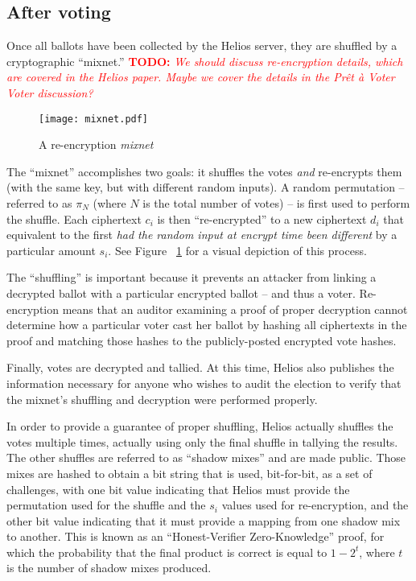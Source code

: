 \documentclass[10pt,twocolumn]{article}
\newcommand{\todo}[1]{\textcolor{red}{\textbf{TODO:} \emph{#1}}}
\newcommand{\term}[1]{\textit{#1}}
\newcommand{\preta}{Pr\^{e}t \`{a}}
\newcommand{\pv}{\preta{} Voter}
\begin{document}
\subsection{After voting}

Once all ballots have been collected by the Helios server, they are shuffled by a cryptographic
``mixnet.'' \todo{We should discuss re-encryption details, which are covered in the Helios paper.
Maybe we cover the details in the \pv{} Voter discussion?}

\begin{figure}
	\center
	\texttt{[image: mixnet.pdf]}
	\caption{A re-encryption \term{mixnet}}
	\label{fig:mixnet}
	\vspace{-25pt}
\end{figure}

The ``mixnet'' accomplishes two goals: it shuffles the votes \emph{and} re-encrypts them (with the
same key, but with different random inputs). A random permutation -- referred to as $\pi_{N}$ (where
$N$ is the total number of votes) -- is first used to perform the shuffle. Each ciphertext
$c_{i}$ is then ``re-encrypted'' to a new ciphertext $d_{i}$ that equivalent to the first \emph{had
the random input at encrypt time been different} by a particular amount $s_{i}$. See Figure
~\ref{fig:mixnet} for a visual depiction of this process.

The ``shuffling'' is important because it prevents an attacker from linking a decrypted ballot with
a particular encrypted ballot -- and thus a voter. Re-encryption means that an auditor examining a
proof of proper decryption cannot determine how a particular voter cast her ballot by hashing
all ciphertexts in the proof and matching those hashes to the publicly-posted encrypted vote hashes.

Finally, votes are decrypted and tallied. At this time, Helios also publishes the information
necessary for anyone who wishes to audit the election to verify that the mixnet's shuffling and
decryption were performed properly.

In order to provide a guarantee of proper shuffling, Helios actually shuffles the votes multiple
times, actually using only the final shuffle in tallying the results. The other shuffles are
referred to as ``shadow mixes'' and are made public. Those mixes are hashed to obtain a bit string
that is used, bit-for-bit, as a set of challenges, with one bit value indicating that Helios must
provide the permutation used for the shuffle and the $s_{i}$ values used for re-encryption, and the
other bit value indicating that it must provide a mapping from one shadow mix to another. This is
known as an ``Honest-Verifier Zero-Knowledge'' proof, for which the probability that the final
product is correct is equal to $1 - 2^{t}$, where $t$ is the number of shadow mixes produced.
\end{document}
